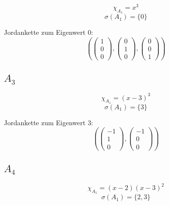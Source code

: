 \documentclass[10pt,a4paper]{article}
\begin{document}
\begin{equation}
\chi_{A_{1}} = x^{3}
\end{equation}
\begin{equation}
\sigma(A_{1}) = \{0\}
\end{equation}

Jordankette zum Eigenwert $0$:
\begin{equation}
\left(
\begin{pmatrix}
1\\0\\0
\end{pmatrix},
\begin{pmatrix}
0\\1\\0
\end{pmatrix},
\begin{pmatrix}
0\\0\\1
\end{pmatrix}
\right)
\end{equation}

\subsection*{$A_{3}$}

\begin{equation}
\chi_{A_{1}} = (x - 3)^{3}
\end{equation}
\begin{equation}
\sigma(A_{1}) = \{3\}
\end{equation}

Jordankette zum Eigenwert $3$:
\begin{equation}
\left(
\begin{pmatrix}
-1\\1\\0
\end{pmatrix},
\begin{pmatrix}
-1\\0\\0
\end{pmatrix}
\right)
\end{equation}

\subsection*{$A_{4}$}

\begin{equation}
\chi_{A_{1}} = (x - 2)(x - 3)^{2}
\end{equation}
\begin{equation}
\sigma(A_{1}) = \{2, 3\}
\end{equation}
\end{document}
